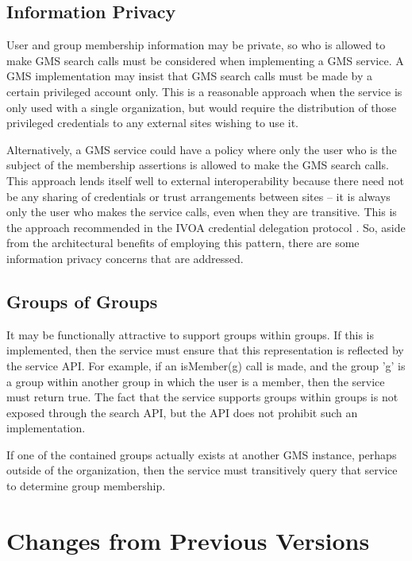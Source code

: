 \documentclass[11pt,a4paper]{ivoa}
\begin{document}
\subsection{Information Privacy}

User and group membership information may be private, so who is allowed to make GMS search calls must be considered when implementing a GMS service.  A GMS implementation may insist that GMS search calls must be made by a certain privileged account only.  This is a reasonable approach when the service is only used with a single organization, but would require the distribution of those privileged credentials to any external sites wishing to use it.

Alternatively, a GMS service could have a policy where only the user who is the subject of the membership assertions is allowed to make the GMS search calls.  This approach lends itself well to external interoperability because there need not be any sharing of credentials or trust arrangements between sites -- it is always only the user who makes the service calls, even when they are transitive.  This is the approach recommended in the  IVOA credential delegation protocol \citep{2010ivoa.spec.0218P}.  So, aside from the architectural benefits of employing this pattern, there are some information privacy concerns that are addressed.

\subsection{Groups of Groups}

It may be functionally attractive to support groups within groups.  If this is implemented, then the service must ensure that this representation is reflected by the service API.  For example, if an isMember(g) call is made, and the group 'g' is a group within another group in which the user is a member, then the service must return true.  The fact that the service supports groups within groups is not exposed through the search API, but the API does not prohibit such an implementation.

If one of the contained groups actually exists at another GMS instance, perhaps outside of the organization, then the service must transitively query that service to determine group membership.

\appendix

\section{Changes from Previous Versions}
\end{document}

